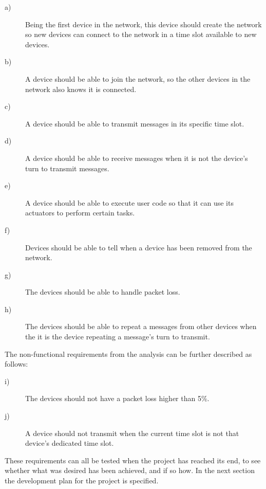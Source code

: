 \begin{description}
    \item[a)] Being the first device in the network, this device should create the network so new devices can connect to the network in a time slot available to new devices.
    \item[b)] A device should be able to join the network, so the other devices in the network also knows it is connected.
    \item[c)] A device should be able to transmit messages in its specific time slot.
    \item[d)] A device should be able to receive messages when it is not the device's turn to transmit messages.
    \item[e)] A device should be able to execute user code so that it can use its actuators to perform certain tasks.
    \item[f)] Devices should be able to tell when a device has been removed from the network.
    \item[g)] The devices should be able to handle packet loss.
    \item[h)] The devices should be able to repeat a messages from other devices when the it is the device repeating a message's turn to transmit.
\end{description} 
\bigskip
The non-functional requirements from the analysis can be further described as follows:
\begin{description}
    \item[i)] The devices should not have a packet loss higher than 5\%.
    \item[j)] A device should not transmit when the current time slot is not that device's dedicated time slot. 
\end{description}

These requirements can all be tested when the project has reached its end, to see whether what was desired has been achieved, and if so how. 
In the next section the development plan for the project is specified.